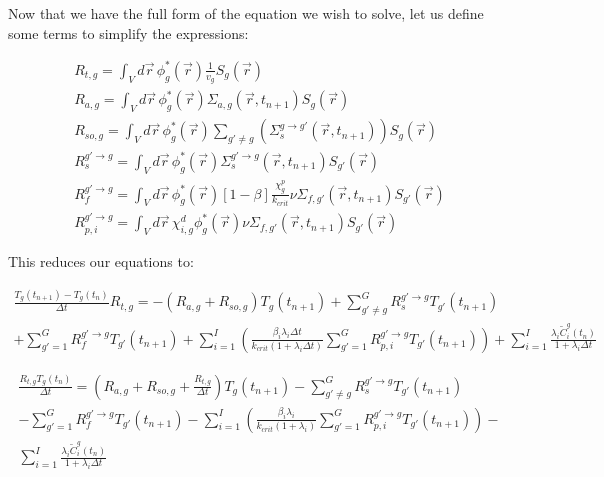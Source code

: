 \documentclass[12pt]{report}
\begin{document}
		Now that we have the full form of the equation we wish to solve, let us define some terms to simplify the expressions:
		
		
		\begin{eqnarray}
		R_{t,g} = \int_{V} d\vec{r} \, \phi_g^*(\vec{r}) \frac{1}{v_g}  S_g(\vec{r}) \\
		R_{a,g} = \int_{V} d\vec{r} \, \phi_g^*(\vec{r}) \Sigma_{a,g}(\vec{r},t_{n+1})  S_g(\vec{r}) \\
		R_{so,g} = \int_{V} d\vec{r} \, \phi_g^*(\vec{r}) \sum_{g'\neq g} \left( \Sigma_{s}^{g\rightarrow g'}(\vec{r},t_{n+1}) \right)  S_g(\vec{r}) \\
		R_{s}^{g'\rightarrow g} = \int_{V}  d\vec{r} \, \phi_g^*(\vec{r})  \Sigma_{s}^{g'\rightarrow g} (\vec{r},t_{n+1})  S_{g'}(\vec{r}) \\
		R_{f}^{g' \rightarrow g} = \int_{V} d\vec{r} \, \phi_g^*(\vec{r}) \left[ 1- \beta \right] \frac{\chi_g^p}{k_{crit}} \nu \Sigma_{f,g'}(\vec{r},t_{n+1}) S_{g'}(\vec{r}) \\
		R_{p,i}^{g' \rightarrow g} = \int_{V} d\vec{r} \, \chi^d_{i,g} \phi_g^*(\vec{r}) \nu \Sigma_{f,g'}(\vec{r},t_{n+1}) S_{g'}(\vec{r})
		\end{eqnarray}
		
		This reduces our equations to:
		
		\begin{eqnarray} 
		\frac{ T_g(t_{n+1}) - T_g(t_{n})}{\Delta t} R_{t,g} = - \left( R_{a,g} + R_{so,g} \right) T_g(t_{n+1}) + \sum_{g'\neq g}^{G} R_s^{g' \rightarrow g} T_{g'}(t_{n+1}) \nonumber \\
		+ \sum_{g'=1}^{G} R_f^{g' \rightarrow g} T_{g'}(t_{n+1}) + \sum_{i=1}^{I} \left( \frac{\beta_i \lambda_i \Delta t}{k_{crit}\left(1+\lambda_i \Delta t\right)} \sum_{g'=1}^{G} R_{p,i}^{g' \rightarrow g} T_{g'}(t_{n+1}) \right) + \sum_{i=1}^{I} \frac{\lambda_i \tilde{C}_i^g(t_{n})}{1+\lambda_i \Delta t}
		\end{eqnarray}
		

		
		\begin{eqnarray} 
		\frac{R_{t,g} T_g(t_{n})}{\Delta t} = \left( R_{a,g} + R_{so,g} + \frac{R_{t,g}}{\Delta t} \right) T_g(t_{n+1}) - \sum_{g'\neq g}^{G} R_s^{g' \rightarrow g} T_{g'}(t_{n+1}) \nonumber \\
		- \sum_{g'=1}^{G} R_f^{g' \rightarrow g} T_{g'}(t_{n+1}) - \sum_{i=1}^{I} \left( \frac{\beta_i \lambda_i}{k_{crit}\left(1+\lambda_i \right)} \sum_{g'=1}^{G} R_{p,i}^{g' \rightarrow g} T_{g'}(t_{n+1}) \right) - \nonumber \\
		\sum_{i=1}^{I} \frac{\lambda_i \tilde{C}_i^g(t_{n})}{1+\lambda_i \Delta t}
		\end{eqnarray}	
		
\end{document}
